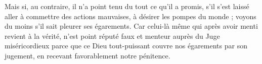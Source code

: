 Mais si, au contraire, il n’a point tenu du tout ce qu’il a promis, s’il s’est laissé aller à commettre des actions mauvaises, à désirer les pompes du monde ; voyons du moins s’il sait pleurer ses égarements. Car celui-là même qui après avoir menti revient à la vérité, n’est point réputé faux et menteur auprès du Juge miséricordieux parce que ce Dieu tout-puissant couvre nos égarements par son jugement, en recevant favorablement notre pénitence.